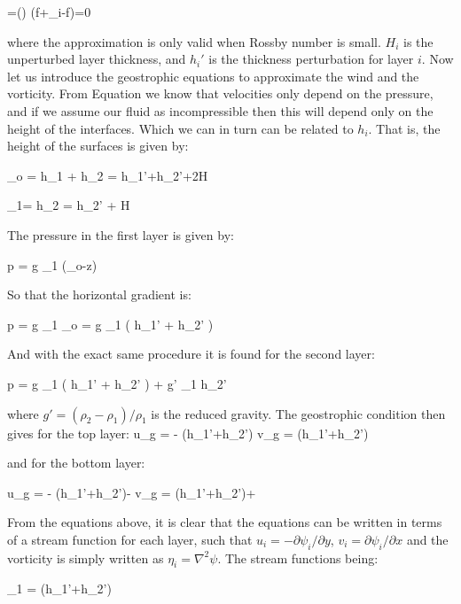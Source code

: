\beq
{}=\left(\right) \simeq {}\left(f+\eta_i-f\right)=0

where the approximation is only valid when Rossby number is small. $H_i$ is the unperturbed layer thickness, and $h_i'$ is the thickness perturbation for layer $i$. Now let us introduce the geostrophic equations to approximate the wind and the vorticity. From Equation  we know that velocities only depend on the pressure, and if we assume our fluid as incompressible then this will depend only on the height of the interfaces. Which we can in turn can be related to $h_i$. That is, the height of the surfaces is given by:

\beq
\eta_o = h_1 + h_2 = h_1'+h_2'+2H

\beq
\eta_1= h_2 = h_2' + H

The pressure in the first layer is given by:

\beq
p = g \rho_1 (\eta_o-z)

So that the horizontal gradient is:

\beq
\nabla p = g \rho_1 \nabla \eta_o = g \rho_1 ( \nabla h_1' + \nabla h_2' )

And with the exact same procedure it is found for the second layer:

\beq
\nabla p =  g \rho_1 ( \nabla h_1' + \nabla h_2' ) + g' \rho_1 \nabla h_2'

where $g'=(\rho_2-\rho_1)/\rho_1$ is the reduced gravity. The geostrophic condition then gives for the top layer:
\beq
u_g = - (h_1'+h_2')
\beq
v_g =  (h_1'+h_2')

and for the bottom layer:

\beq
u_g = - (h_1'+h_2')- 
\beq
v_g =  (h_1'+h_2')+ 

From the equations above, it is clear that the equations can be written in terms of a stream function for each layer, such that $u_i=-\partial \psi_i / \partial y$, $v_i=\partial \psi_i / \partial x$ and the vorticity is simply written as $\eta_i = \nabla ^2 \psi$. The stream functions being:

\beq
\psi _1 =  (h_1'+h_2')

